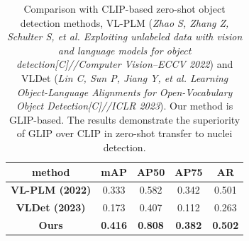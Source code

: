 \documentclass[runningheads]{llncs}
\begin{document}
\begin{table}[t]
\caption{Comparison with CLIP-based zero-shot object detection methods, VL-PLM (\textit{Zhao S, Zhang Z, Schulter S, et al. Exploiting unlabeled data with vision and language models for object detection[C]//Computer Vision–ECCV 2022}) and VLDet (\textit{Lin C, Sun P, Jiang Y, et al. Learning Object-Language Alignments for Open-Vocabulary Object Detection[C]//ICLR 2023}). Our method is GLIP-based. The results demonstrate the superiority of GLIP over CLIP in zero-shot transfer to nuclei detection.}
\centering
\begin{tabular}{c|cccc}
\hline
\textbf{method}        & \textbf{mAP}   & \textbf{AP50}  & \textbf{AP75}  & \textbf{AR}    \\ \hline
\textbf{VL-PLM (2022)} & 0.333          & 0.582          & 0.342          & 0.501          \\
\textbf{VLDet (2023)}  & 0.173          & 0.407          & 0.112          & 0.263          \\ \hline
\textbf{Ours}          & \textbf{0.416} & \textbf{0.808} & \textbf{0.382} & \textbf{0.502} \\ \hline
\end{tabular}%
\end{table}


\end{document}
